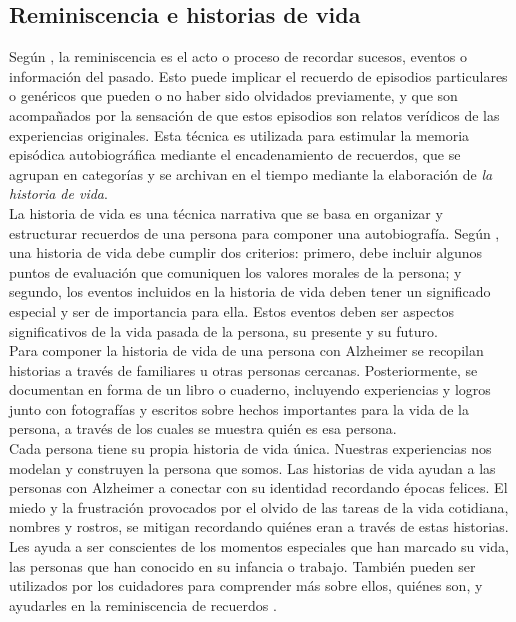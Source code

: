 \subsection{Reminiscencia e historias de vida}
Según \cite{o2013cross}, la reminiscencia es el acto o proceso de recordar sucesos, eventos o información del pasado. Esto puede implicar el recuerdo de episodios particulares o genéricos que pueden o no haber sido olvidados previamente, y que son acompañados por la sensación de que estos episodios son relatos verídicos de las experiencias originales. Esta técnica es utilizada para estimular la memoria episódica autobiográfica mediante el encadenamiento de recuerdos, que se agrupan en categorías y se archivan en el tiempo mediante la elaboración de \textit{la historia de vida}.\\


La historia de vida es una técnica narrativa que se basa en organizar y estructurar recuerdos de una persona para componer una autobiografía. Según \cite{linde1993life}, una historia de vida debe cumplir dos criterios: primero, debe incluir algunos puntos de evaluación que comuniquen los valores morales de la persona; y segundo, los eventos incluidos en la historia de vida deben tener un significado especial y ser de importancia para ella. Estos eventos deben ser aspectos significativos de la vida pasada de la persona, su presente y su futuro.\\

Para componer la historia de vida de una persona con Alzheimer se recopilan historias a través de familiares u otras personas cercanas. Posteriormente, se documentan en forma de un libro o cuaderno, incluyendo experiencias y logros junto con fotografías y escritos sobre hechos importantes para la vida de la persona, a través de los cuales se muestra quién es esa persona.\\

Cada persona tiene su propia historia de vida única. Nuestras experiencias nos modelan y construyen la persona que somos. Las historias de vida ayudan a las personas con Alzheimer a conectar con su identidad recordando épocas felices. El miedo y la frustración provocados por el olvido de las tareas de la vida cotidiana, nombres y rostros, se mitigan recordando quiénes eran a través de estas historias. Les ayuda a ser conscientes de los momentos especiales que han marcado su vida, las personas que han conocido en su infancia o trabajo. También pueden ser utilizados por los cuidadores para comprender más sobre ellos, quiénes son, y ayudarles en la reminiscencia de recuerdos \citep{karlsson2014stories}.\\


